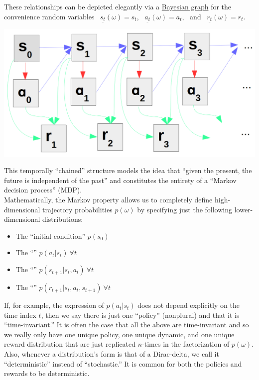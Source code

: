 These relationships can be depicted elegantly via a \href{https://en.wikipedia.org/wiki/Bayesian_network}{Bayesian graph} for the convenience random variables \ $\underline{s_t}(\omega) = s_t$, \ $\underline{a_t}(\omega) = a_t$, \ and \ $\underline{r_t}(\omega) = r_t$.
\begin{center}
  \includegraphics[width=\linewidth-1.5in]{include/bayesgraph.png}
\end{center}

This temporally ``chained'' structure models the idea that ``given the present, the future is independent of the past'' and constitutes the entirety of a ``Markov decision process'' (MDP).\\

Mathematically, the Markov property allows us to completely define high-dimensional trajectory probabilities $p(\omega)$ by specifying just the following lower-dimensional distributions:
\begin{itemize}
  \item The ``initial condition'' $p(s_0)$
  \item The ``'' $p(a_t|s_t)\ \forall t$
  \item The ``'' $p(s_{t+1}|s_t,a_t)\ \forall t$
  \item The ``'' $p(r_{t+1}|s_t,a_t,s_{t+1})\ \forall t$
\end{itemize}

If, for example, the expression of $p(a_t|s_t)$ does not depend explicitly on the time index $t$, then we say there is just one ``policy'' (nonplural) and that it is ``time-invariant.'' It is often the case that all the above are time-invariant and so we really only have one unique policy, one unique dynamic, and one unique reward distribution that are just replicated $n$-times in the factorization of $p(\omega)$. Also, whenever a distribution's form is that of a Dirac-delta, we call it ``deterministic'' instead of ``stochastic.'' It is common for both the policies and rewards to be deterministic.\\

